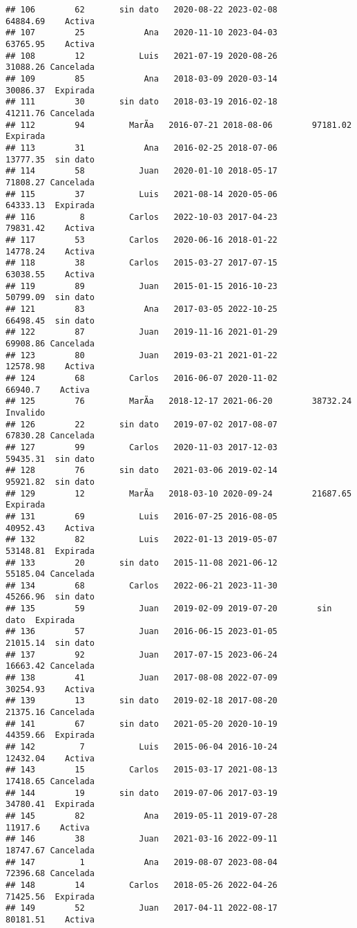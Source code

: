 \documentclass[
]{article}
\begin{document}
\begin{verbatim}
## 106        62       sin dato   2020-08-22 2023-02-08        64884.69    Activa
## 107        25            Ana   2020-11-10 2023-04-03        63765.95    Activa
## 108        12           Luis   2021-07-19 2020-08-26        31088.26 Cancelada
## 109        85            Ana   2018-03-09 2020-03-14        30086.37  Expirada
## 111        30       sin dato   2018-03-19 2016-02-18        41211.76 Cancelada
## 112        94         MarÃ­a   2016-07-21 2018-08-06        97181.02  Expirada
## 113        31            Ana   2016-02-25 2018-07-06        13777.35  sin dato
## 114        58           Juan   2020-01-10 2018-05-17        71808.27 Cancelada
## 115        37           Luis   2021-08-14 2020-05-06        64333.13  Expirada
## 116         8         Carlos   2022-10-03 2017-04-23        79831.42    Activa
## 117        53         Carlos   2020-06-16 2018-01-22        14778.24    Activa
## 118        38         Carlos   2015-03-27 2017-07-15        63038.55    Activa
## 119        89           Juan   2015-01-15 2016-10-23        50799.09  sin dato
## 121        83            Ana   2017-03-05 2022-10-25        66498.45  sin dato
## 122        87           Juan   2019-11-16 2021-01-29        69908.86 Cancelada
## 123        80           Juan   2019-03-21 2021-01-22        12578.98    Activa
## 124        68         Carlos   2016-06-07 2020-11-02         66940.7    Activa
## 125        76         MarÃ­a   2018-12-17 2021-06-20        38732.24  Invalido
## 126        22       sin dato   2019-07-02 2017-08-07        67830.28 Cancelada
## 127        99         Carlos   2020-11-03 2017-12-03        59435.31  sin dato
## 128        76       sin dato   2021-03-06 2019-02-14        95921.82  sin dato
## 129        12         MarÃ­a   2018-03-10 2020-09-24        21687.65  Expirada
## 131        69           Luis   2016-07-25 2016-08-05        40952.43    Activa
## 132        82           Luis   2022-01-13 2019-05-07        53148.81  Expirada
## 133        20       sin dato   2015-11-08 2021-06-12        55185.04 Cancelada
## 134        68         Carlos   2022-06-21 2023-11-30        45266.96  sin dato
## 135        59           Juan   2019-02-09 2019-07-20        sin dato  Expirada
## 136        57           Juan   2016-06-15 2023-01-05        21015.14  sin dato
## 137        92           Juan   2017-07-15 2023-06-24        16663.42 Cancelada
## 138        41           Juan   2017-08-08 2022-07-09        30254.93    Activa
## 139        13       sin dato   2019-02-18 2017-08-20        21375.16 Cancelada
## 141        67       sin dato   2021-05-20 2020-10-19        44359.66  Expirada
## 142         7           Luis   2015-06-04 2016-10-24        12432.04    Activa
## 143        15         Carlos   2015-03-17 2021-08-13        17418.65 Cancelada
## 144        19       sin dato   2019-07-06 2017-03-19        34780.41  Expirada
## 145        82            Ana   2019-05-11 2019-07-28         11917.6    Activa
## 146        38           Juan   2021-03-16 2022-09-11        18747.67 Cancelada
## 147         1            Ana   2019-08-07 2023-08-04        72396.68 Cancelada
## 148        14         Carlos   2018-05-26 2022-04-26        71425.56  Expirada
## 149        52           Juan   2017-04-11 2022-08-17        80181.51    Activa
\end{verbatim}
\end{document}
